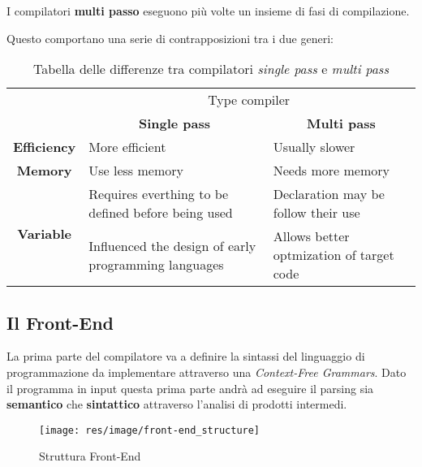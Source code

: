 \begin{definition}
I compilatori \textbf{multi passo} eseguono più volte un insieme di fasi di
compilazione.
\end{definition}

Questo comportano una serie di contrapposizioni tra i due generi:
\begin{table}[H]
\begin{center}
\begin{tabular}{p{3cm}|p{5cm}|p{5cm}|}
\cline{2-3}
& \multicolumn{2}{|c|}{Type compiler} \\ \cline{2-3}
& \multicolumn{1}{c|}{\textbf{Single pass}} &
\multicolumn{1}{c|}{\textbf{Multi pass}} \\ \hline
\multicolumn{1}{|c|}{\textbf{Efficiency}} &
More efficient & Usually slower \\ \hline
\multicolumn{1}{|c|}{\textbf{Memory}} & Use less memory &
Needs more memory \\ \hline
\multicolumn{1}{|c|}{\multirow{2}{*}{\textbf{Variable}}} &
Requires everthing to be defined before being used &
Declaration may be follow their use \\ \hline
\multicolumn{1}{|c|}{\multirow{2}{*}{\textbf{Feature}}} &
Influenced the design of early programming languages &
Allows better optmization of target code \\ \hline
\end{tabular}
\end{center}
\caption{
Tabella delle differenze tra compilatori \textit{single pass} e
\textit{multi pass}
}
\label{tab:difference_single_multi_pass_compilers}
\end{table}

\subsection{Il Front-End}
\label{sec:front-end}
La prima parte del compilatore va a definire la sintassi del linguaggio di
programmazione da implementare attraverso una \textit{Context-Free Grammars}.
Dato il programma in input questa prima parte andrà ad eseguire il parsing sia
\textbf{semantico} che \textbf{sintattico} attraverso l'analisi di prodotti
intermedi.

\begin{figure}[H]
  \texttt{[image: res/image/front-end\_structure]}
  \caption{Struttura Front-End}
  \label{fig:front-end_structure}
\end{figure}

